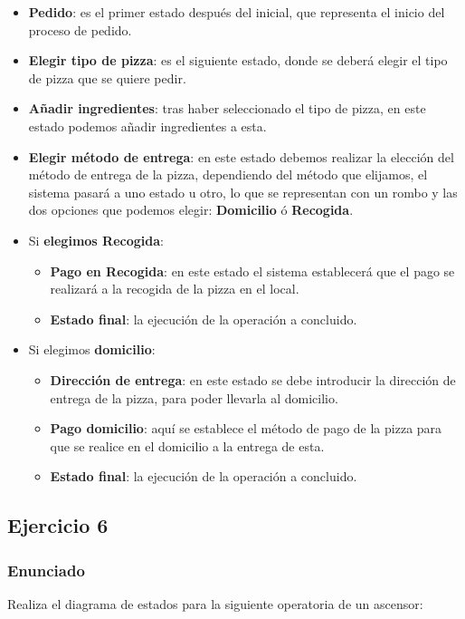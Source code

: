 \begin{itemize}
    \item \textbf{Pedido}: es el primer estado después del inicial, que representa el inicio del proceso de pedido.
    \item \textbf{Elegir tipo de pizza}: es el siguiente estado, donde se deberá elegir el tipo de pizza que se quiere pedir.
    \item \textbf{Añadir ingredientes}: tras haber seleccionado el tipo de pizza, en este estado podemos añadir ingredientes a esta.
    \item \textbf{Elegir método de entrega}: en este estado debemos realizar la elección del método de entrega de la pizza, dependiendo del método que elijamos, el sistema pasará a uno estado u otro, lo que se representan con un rombo y las dos opciones que podemos elegir: \textbf{Domicilio} ó \textbf{Recogida}.
    \item Si \textbf{elegimos Recogida}:
    \begin{itemize}
        \item \textbf{Pago en Recogida}: en este estado el sistema establecerá que el pago se realizará a la recogida de la pizza en el local.
        \item \textbf{Estado final}: la ejecución de la operación a concluido.
    \end{itemize}

    \item Si elegimos \textbf{domicilio}:
    \begin{itemize}
        \item \textbf{Dirección de entrega}: en este estado se debe introducir la dirección de entrega de la pizza, para poder llevarla al domicilio.
        \item \textbf{Pago domicilio}: aquí se establece el método de pago de la pizza para que se realice en el domicilio a la entrega de esta.
        \item \textbf{Estado final}: la ejecución de la operación a concluido.
    \end{itemize}
\end{itemize}

\subsection{Ejercicio 6}

\subsubsection{Enunciado}
Realiza el diagrama de estados para la siguiente operatoria de un ascensor:

